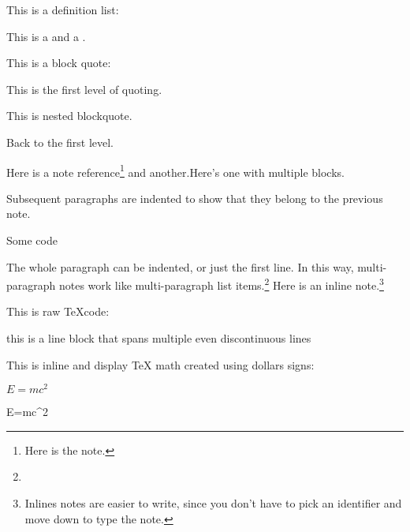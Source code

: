 \documentclass[
]{}
\begin{document}
This is a definition list:

This is a  and a .

This is a block quote:

\startblockquote
This is the first level of quoting.

\startblockquote
This is nested blockquote.
\stopblockquote

Back to the first level.
\stopblockquote

Here is a note reference\footnote{Here is the note.} and
another.\startbuffer Here's one with multiple blocks.

  Subsequent paragraphs are indented to show that they belong to the
  previous note.

\starttyping
Some code
\stoptyping

  The whole paragraph can be indented, or just the first line. In this
  way, multi-paragraph notes work like multi-paragraph list items.\stopbuffer\footnote{\getbuffer}
Here is an inline note.\footnote{Inlines notes are easier to write,
  since you don't have to pick an identifier and move down to type the
  note.}

This is raw \TeX code:

\startlines
this is a line block that
spans multiple
even discontinuous
lines
\stoplines

This is inline and display TeX math created using dollars signs:

$E=mc^2$

\startformula E=mc^2 \stopformula

\stopsectionlevel

\stopsectionlevel

\stopsectionlevel

\stopsectionlevel

\stopsectionlevel
\end{document}
